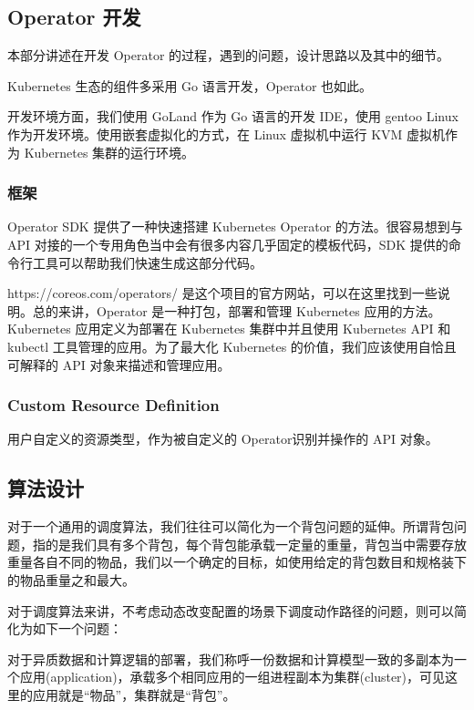 
\subsection{Operator 开发}

本部分讲述在开发 Operator 的过程，遇到的问题，设计思路以及其中的细节。

Kubernetes 生态的组件多采用 Go 语言开发，Operator 也如此。

开发环境方面，我们使用 GoLand 作为 Go 语言的开发 IDE，使用 gentoo Linux 作为开发环境。使用嵌套虚拟化的方式，在 Linux 虚拟机中运行 KVM 虚拟机作为 Kubernetes 集群的运行环境。

\subsubsection{框架}

Operator SDK 提供了一种快速搭建 Kubernetes Operator 的方法。很容易想到与 API 对接的一个专用角色当中会有很多内容几乎固定的模板代码，SDK 提供的命令行工具可以帮助我们快速生成这部分代码。

https://coreos.com/operators/ 是这个项目的官方网站，可以在这里找到一些说明。总的来讲，Operator 是一种打包，部署和管理 Kubernetes 应用的方法。Kubernetes 应用定义为部署在 Kubernetes 集群中并且使用 Kubernetes API 和 kubectl 工具管理的应用。为了最大化 Kubernetes 的价值，我们应该使用自恰且可解释的 API 对象来描述和管理应用。

\subsubsection{Custom Resource Definition}

用户自定义的资源类型，作为被自定义的 Operator识别并操作的 API 对象。

\subsection{算法设计}

对于一个通用的调度算法，我们往往可以简化为一个背包问题的延伸。所谓背包问题，指的是我们具有多个背包，每个背包能承载一定量的重量，背包当中需要存放重量各自不同的物品，我们以一个确定的目标，如使用给定的背包数目和规格装下的物品重量之和最大。

对于调度算法来讲，不考虑动态改变配置的场景下调度动作路径的问题，则可以简化为如下一个问题：

对于异质数据和计算逻辑的部署，我们称呼一份数据和计算模型一致的多副本为一个应用(application)，承载多个相同应用的一组进程副本为集群(cluster)，可见这里的应用就是“物品”，集群就是“背包”。

